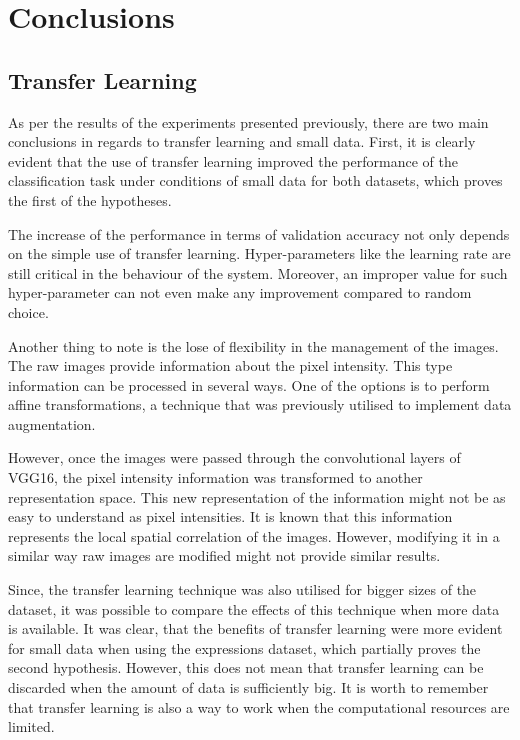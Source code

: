 \documentclass{article}
\begin{document}
\section{Conclusions}
\label{sec:conclusions}

\subsection{Transfer Learning}

As per the results of the experiments presented previously, there are two main conclusions in regards to transfer learning and small data. First, it is clearly evident that the use of transfer learning improved the performance of the classification task under conditions of small data for both datasets, which proves the first of the hypotheses.

The increase of the performance in terms of validation accuracy not only depends on the simple use of transfer learning. Hyper-parameters like the learning rate are still critical in the behaviour of the system. Moreover, an improper value for such hyper-parameter can not even make any improvement compared to random choice. 

Another thing to note is the lose of flexibility in the management of the images. The raw images provide information about the pixel intensity. This type information can be processed in several ways. One of the options is to perform affine transformations, a technique that was previously utilised to implement data augmentation.

However, once the images were passed through the convolutional layers of VGG16, the pixel intensity information was transformed to another representation space. This new representation of the information might not be as easy to understand as pixel intensities. It is known that this information represents the local spatial correlation of the images. However, modifying it in a similar way raw images are modified might not provide similar results.

Since, the transfer learning technique was also utilised for bigger sizes of the dataset, it was possible to compare the effects of this technique when more data is available. It was clear, that the benefits of transfer learning were more evident for small data when using the expressions dataset, which partially proves the second hypothesis. However, this does not mean that transfer learning can be discarded when the amount of data is sufficiently big. It is worth to remember that transfer learning is also a way to work when the computational resources are limited.
\end{document}
